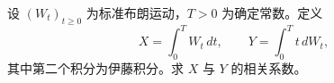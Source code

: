 设 $(W_t)_{t\ge0}$ 为标准布朗运动，$T>0$ 为确定常数。定义
\[
 X=\int_0^T W_t\,dt,\qquad
 Y=\int_0^T t\,dW_t,
\]
其中第二个积分为伊藤积分。求 $X$ 与 $Y$ 的相关系数。
